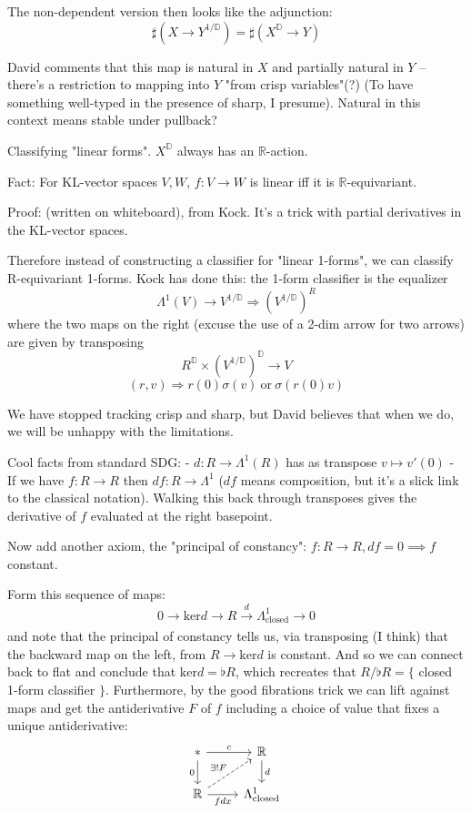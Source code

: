 \documentclass[17pt]{extarticle}
\begin{document}
The non-dependent version then looks like the adjunction: $$\sharp(X\to Y^{1/\mathbb{D}}) = \sharp(X^{\mathbb{D}} \to Y)$$

David comments that this map is natural in $X$ and partially natural in $Y$ -- there's a restriction to mapping into $Y$ "from crisp variables"(?) (To have something well-typed in the presence of sharp, I presume). Natural in this context means stable under pullback?

Classifying "linear forms". $X^{\mathbb{D}}$ always has an $\mathbb{R}$-action.

Fact: For KL-vector spaces $V, W$, $f:V\to W$ is linear iff it is $\mathbb{R}$-equivariant.

Proof: (written on whiteboard), from Kock. It's a trick with partial derivatives in the KL-vector spaces.

Therefore instead of constructing a classifier for "linear 1-forms", we can classify R-equivariant 1-forms. Kock has done this: the 1-form classifier is the equalizer $$\Lambda^1(V)\to V^{1/\mathbb{D}} \Rightarrow  (V^{1/\mathbb{D}})^R$$
where the two maps on the right (excuse the use of a 2-dim arrow for two arrows) are given by transposing $$R^{\mathbb{D}} \times (V^{1/\mathbb{D}})^{\mathbb{D}}\to V$$ $$(r, v) \Rightarrow r(0)\sigma(v) \mathrm{\ or\ }\sigma(r(0)v)$$

We have stopped tracking crisp and sharp, but David believes that when we do, we will be unhappy with the limitations.

Cool facts from standard SDG:
- $d:R\to \Lambda^1(R)$ has as transpose $v\mapsto v'(0)$
- If we have $f:R\to R$ then $df:R\to\Lambda^1$ ($df$ means composition, but it's a slick link to the classical notation). Walking this back through transposes gives the derivative of $f$ evaluated at the right basepoint.

Now add another axiom, the "principal of constancy": $f:R\to R, df=0 \implies f$ constant.

Form this sequence of maps: $$0\to \mathrm{ker}d\to R\xrightarrow[]{d} \Lambda^1_{\mathrm{closed}} \to 0$$
and note that the principal of constancy tells us, via transposing (I think) that the backward map on the left, from $R\to \mathrm{ker}d$ is constant. And so we can connect back to flat and conclude that $\mathrm{ker}d = \flat R$, which recreates that $R / \flat R = \{\!$ closed 1-form classifier $\!\}$. Furthermore, by the good fibrations trick we can lift against maps and get the antiderivative $F$ of $f$ including a choice of value that fixes a unique antiderivative:
\[\begin{tikzcd}
	{*} & {\mathbb{R}} \\
	{\mathbb{R}} & {\Lambda^1_\mathrm{closed}}
	\arrow["c", from=1-1, to=1-2]
	\arrow["d", from=1-2, to=2-2]
	\arrow["0"', from=1-1, to=2-1]
	\arrow["fdx"', from=2-1, to=2-2]
	\arrow["{\exists !F}", dashed, from=2-1, to=1-2]
\end{tikzcd}\]
\end{document}
